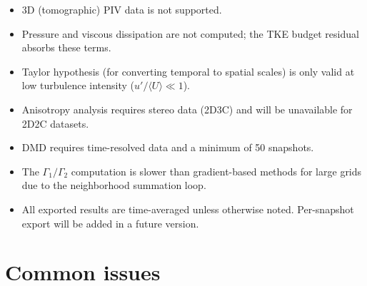 \documentclass[11pt, a4paper]{report}
\begin{document}
\begin{itemize}[leftmargin=1.5em]
  \item 3D (tomographic) PIV data is not supported.
  \item Pressure and viscous dissipation are not computed; the TKE budget residual absorbs these terms.
  \item Taylor hypothesis (for converting temporal to spatial scales) is only valid at low turbulence intensity ($u'/\langle U\rangle \ll 1$).
  \item Anisotropy analysis requires stereo data (2D3C) and will be unavailable for 2D2C datasets.
  \item DMD requires time-resolved data and a minimum of 50 snapshots.
  \item The $\Gamma_1/\Gamma_2$ computation is slower than gradient-based methods for large grids due to the neighborhood summation loop.
  \item All exported results are time-averaged unless otherwise noted. Per-snapshot export will be added in a future version.
\end{itemize}

\section{Common issues}
\end{document}
